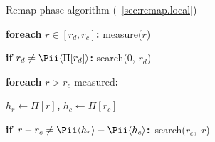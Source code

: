 \begin{algorithm}[h]
\caption{Remap phase algorithm (\secstr~\ref{sec:remap.local})}





\textbf{foreach} $r \in [r_d, r_c]$\textbf{:} measure($r$)

\textbf{if} $r_d \ne \Pii\langle \Pi[r_d]\rangle$\textbf{:}
search(0, $r_d$)

\textbf{foreach} $r > r_c$ measured\textbf{:}

\Indp
$h_r \leftarrow \Pi[r]$\textbf{,} $h_c \leftarrow \Pi[r_c]$

\mbox{\textbf{if} $r - r_c \ne \Pii\langle h_r\rangle -
\Pii\langle h_c\rangle$\textbf{:} search($r_c$, $r$)}

\end{algorithm}


